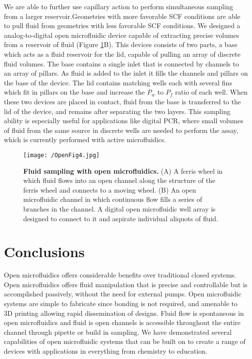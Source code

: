We are able to further use capillary action to perform simultaneous sampling from a larger reservoir.Geometries with more favorable SCF conditions are able to pull fluid from geometries with less favorable SCF conditions. We designed a analog-to-digital open microfluidic device capable of extracting precise volumes from a reservoir of fluid (Figure \ref{figure:OpenFig4}B). This devices consists of two parts, a base which acts as a fluid reservoir for the lid, capable of pulling an array of discrete fluid volumes. The base contains a single inlet that is connected by channels to an array of pillars. As fluid is added to the inlet it fills the channels and pillars on the base of the device. The lid contains matching wells each with several fins which fit in pillars on the base and increase the $P_{w}$ to $P_{f}$ ratio of each well. When these two devices are placed in contact, fluid from the base is transferred to the lid of the device, and remains after separating the two layers. This sampling ability is especially useful for applications like digital PCR, where small volumes of fluid from the same source in discrete wells are needed to perform the assay, which is currently performed with active microfluidics.


\begin{figure}[h!] %
\centering
\texttt{[image: /OpenFig4.jpg]}
\caption[\textbf{Fluid sampling with open microfluidics}]{\textbf{Fluid sampling with open microfluidics.} (A) A ferris wheel in which fluid flows into an open channel along the structure of the ferris wheel and connects to a moving wheel. (B) An open microfluidic channel in which continuous flow fills a series of branches in the channel. A digital open microfluidic well array is designed to connect to it and aspirate individual aliquots of fluid. }
\label{figure:OpenFig4}
\end{figure}

\section{Conclusions}
Open microfluidics offers considerable benefits over traditional closed systems. Open microfluidics offers fluid manipulation that is precise and controllable but is accomplished passively, without the need for external pumps. Open microfluidic systems are simple to fabricate since bonding is not required, and amenable to 3D printing allowing rapid dissemination of designs. Fluid flow is spontaneous in open microfluidics and fluid is open channels is accessible throughout the entire channel through pipette or build in sampling. We have demonstrated several capabilities of open microfluidic systems that can be built on to create a range of devices with applications in everything from chemistry to education. 